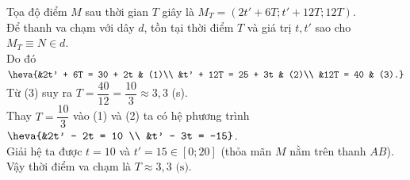 \begin{ex}
{\begin{itemchoice}
			Tọa độ điểm $M$ sau thời gian $T$ giây là $M_T = (2t' + 6T; t' + 12T; 12T)$.\\
			Để thanh va chạm với dây $d$, tồn tại thời điểm $T$ và giá trị $t, t'$ sao cho $M_T \equiv N \in d$. \\
			Do đó
			$\heva{&2t' + 6T = 30 + 2t & (1)\\ &t' + 12T = 25 + 3t & (2)\\ &12T = 40 & (3).}$\\
			Từ (3) suy ra $T = \dfrac{40}{12} = \dfrac{10}{3} \approx 3{,}3$ (s). \\
			Thay $T = \dfrac{10}{3}$ vào (1) và (2) ta có hệ phương trình
			$\heva{&2t' - 2t = 10 \\ &t' - 3t = -15}$. \\
			Giải hệ ta được $t = 10$ và $t' = 15 \in [0; 20]$ (thỏa mãn $M$ nằm trên thanh $AB$).\\
			Vậy thời điểm va chạm là $T \approx 3{,}3 \text{ (s)}$.
		\end{itemchoice}
	}
\end{ex}

